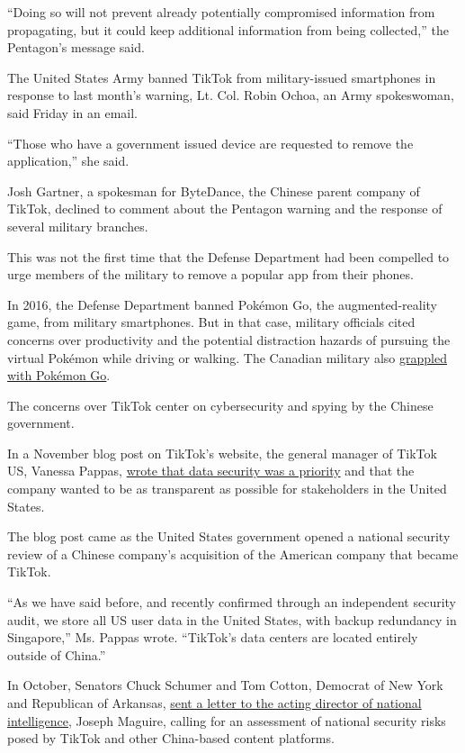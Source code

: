 ``Doing so will not prevent already potentially compromised information
from propagating, but it could keep additional information from being
collected,'' the Pentagon's message said.

The United States Army banned TikTok from military-issued smartphones in
response to last month's warning, Lt. Col. Robin Ochoa, an Army
spokeswoman, said Friday in an email.

``Those who have a government issued device are requested to remove the
application,'' she said.

Josh Gartner, a spokesman for ByteDance, the Chinese parent company of
TikTok, declined to comment about the Pentagon warning and the response
of several military branches.

This was not the first time that the Defense Department had been
compelled to urge members of the military to remove a popular app from
their phones.

In 2016, the Defense Department banned Pokémon Go, the augmented-reality
game, from military smartphones. But in that case, military officials
cited concerns over productivity and the potential distraction hazards
of pursuing the virtual Pokémon while driving or walking. The Canadian
military also
\href{https://www.nytimes.com/2020/01/01/world/canada/pokemon-go-canada-military.html}{grappled
with Pokémon Go}.

The concerns over TikTok center on cybersecurity and spying by the
Chinese government.

In a November blog post on TikTok's website, the general manager of
TikTok US, Vanessa Pappas,
\href{https://newsroom.tiktok.com/en-us/explaining-tiktoks-approach-in-the-us}{wrote
that data security was a priority} and that the company wanted to be as
transparent as possible for stakeholders in the United States.

The blog post came as the United States government opened a national
security review of a Chinese company's acquisition of the American
company that became TikTok.

``As we have said before, and recently confirmed through an independent
security audit, we store all US user data in the United States, with
backup redundancy in Singapore,'' Ms. Pappas wrote. ``TikTok's data
centers are located entirely outside of China.''

In October, Senators Chuck Schumer and Tom Cotton, Democrat of New York
and Republican of Arkansas,
\href{https://www.democrats.senate.gov/imo/media/doc/10232019\%20TikTok\%20Letter\%20-\%20FINAL\%20PDF.pdf}{sent
a letter to the acting director of national intelligence}, Joseph
Maguire, calling for an assessment of national security risks posed by
TikTok and other China-based content platforms.

